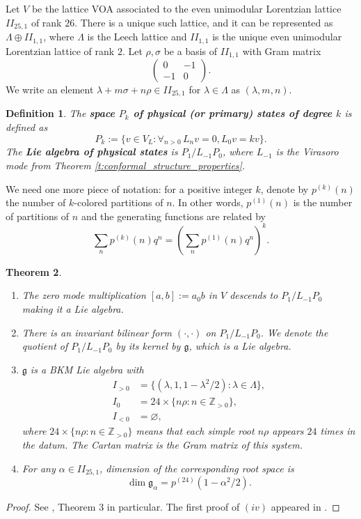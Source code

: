 \documentclass[11pt]{amsart}
\newcommand{\Z}{\mathbb{Z}}
\newcommand{\g}{\mathfrak{g}}
\newcommand{\mat}[4]{\begin{pmatrix} #1 & #2 \\ #3 & #4 \end{pmatrix}}
\numberwithin{equation}{section}
\theoremstyle{plain}
\newtheorem{theorem}{Theorem}[section]
\newtheorem{definition}[theorem]{Definition}
\theoremstyle{definition}
\begin{document}
Let $V$ be the lattice VOA associated to the even unimodular Lorentzian lattice $II_{25,1}$ of rank $26$. There is a unique such lattice, and it can be represented as $\Lambda\oplus II_{1,1}$, where $\Lambda$ is the Leech lattice and $II_{1,1}$ is the unique even unimodular Lorentzian lattice of rank $2$. Let $\rho,\sigma$ be a basis of $II_{1,1}$ with Gram matrix
$$
\mat{0}{-1}{-1}{0}.
$$
We write an element $\lambda+m\sigma+n\rho\in II_{25,1}$ for $\lambda\in \Lambda$ as $(\lambda,m,n)$.
\begin{definition}
    The {\bfseries space $P_k$ of  physical (or primary) states of degree $k$} is defined as
    $$
    P_k:=\{v\in V_L:\forall_{n>0}\,L_nv=0, L_0v=kv\}.
    $$
    The {\bfseries Lie algebra of physical states} is $P_1/L_{-1}P_0$, where $L_{-1}$ is the Virasoro mode from Theorem \ref{t:conformal_structure_properties}.
\end{definition}

We need one more piece of notation: for a positive integer $k$, denote by $p^{(k)}(n)$ the number of $k$-colored partitions of $n$. In other words, $p^{(1)}(n)$ is the number of partitions of $n$ and the generating functions are related by
$$
\sum_{n}p^{(k)}(n)q^n=\left(\sum_{n}p^{(1)}(n)q^n\right)^k.
$$
\begin{theorem}\,\label{t:fake_monster_properties}
    \begin{enumerate}[label=(\roman*)]
        \item The zero mode multiplication $[a,b]:=a_0b$ in $V$ descends to $P_1/L_{-1}P_0$ making it a Lie algebra.
        \item There is an invariant bilinear form $(\cdot,\cdot)$ on $P_1/L_{-1}P_0$. We denote the quotient of $P_1/L_{-1}P_0$ by its kernel by $\g$, which is a Lie algebra.
        \item $\g$ is a BKM Lie algebra with
        \begin{align*}
            I_{>0}&=\{(\lambda,1,1-\lambda^2/2):\lambda\in\Lambda\},\\
            I_0&=24\times \{n\rho:n\in\Z_{>0}\},\\
            I_{<0}&=\varnothing,
        \end{align*}
        where $24\times \{n\rho:n\in\Z_{>0}\}$ means that each simple root $n\rho$ appears $24$ times in the datum. The Cartan matrix is the Gram matrix of this system.
        \item For any $\alpha\in II_{25,1}$, dimension of the corresponding root space is
        $$
        \dim \g_\alpha=p^{(24)}(1-\alpha^2/2).
        $$
    \end{enumerate}
\end{theorem}
\begin{proof}
    See \cite{Bor90}, Theorem 3 in particular. The first proof of $(iv)$ appeared in \cite{F85}.
\end{proof}
\end{document}
